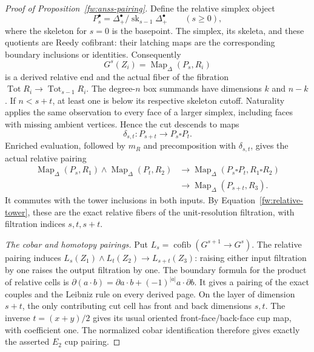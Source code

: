 \begin{proof}[Proof of Proposition~\ref{fw:anss-pairing}]
Define the relative simplex object
\[
 P_s^\bullet=\Delta^\bullet_+/\operatorname{sk}_{s-1}
                      \Delta^\bullet_+\qquad(s\geq0),
\]
where the skeleton for $s=0$ is the basepoint.  The simplex, its
skeleta, and these quotients are Reedy cofibrant: their latching maps
are the corresponding boundary inclusions or identities.  Consequently
\begin{equation}
 G^s(Z_i)=\operatorname{Map}_\Delta(P_s,R_i)
 \label{fw:relative-end-model}
\end{equation}
is a derived relative end and the actual fiber of the fibration
$\operatorname{Tot}R_i\to\operatorname{Tot}_{s-1}R_i$.
The degree-$n$ box summands have dimensions $k$ and $n-k$.
If $n<s+t$, at least one is below its respective skeleton cutoff.
Naturality applies the same observation to every face of a larger
simplex, including faces with missing ambient vertices.  Hence the
cut descends to maps
\begin{equation}
 \delta_{s,t}:P_{s+t}\longrightarrow P_s\square P_t.
 \label{fw:relative-cut}
\end{equation}
Enriched evaluation, followed by $m_R$ and precomposition with
$\delta_{s,t}$, gives the actual relative pairing
\begin{align*}
 \operatorname{Map}_\Delta(P_s,R_1)\wedge
 \operatorname{Map}_\Delta(P_t,R_2)
 &\longrightarrow
 \operatorname{Map}_\Delta(P_s\square P_t,R_1\square R_2)\\
 &\longrightarrow
 \operatorname{Map}_\Delta(P_{s+t},R_3).
\end{align*}
It commutes with the tower inclusions in both inputs.  By
Equation~\eqref{fw:relative-tower}, these are the exact relative fibers
of the unit-resolution filtration, with filtration indices $s,t,s+t$.

\smallskip\noindent\emph{The cobar and homotopy pairings.}
Put $L_s=\operatorname{cofib}(G^{s+1}\to G^s)$.  The relative pairing
induces $L_s(Z_1)\wedge L_t(Z_2)\to L_{s+t}(Z_3)$: raising either
input filtration by one raises the output filtration by one.
The boundary formula for the product of relative cells is
$\partial(a\cdot b)=\partial a\cdot b+(-1)^{|a|}a\cdot\partial b$.
It gives a pairing of the exact couples and the Leibniz rule on every
derived page.  On the layer of dimension $s+t$, the only contributing
cut cell has front and back dimensions $s,t$.  The inverse
$t=(x+y)/2$ gives its usual oriented front-face/back-face cup map,
with coefficient one.  The normalized cobar identification therefore
gives exactly the asserted $E_2$ cup pairing.


\end{proof}
